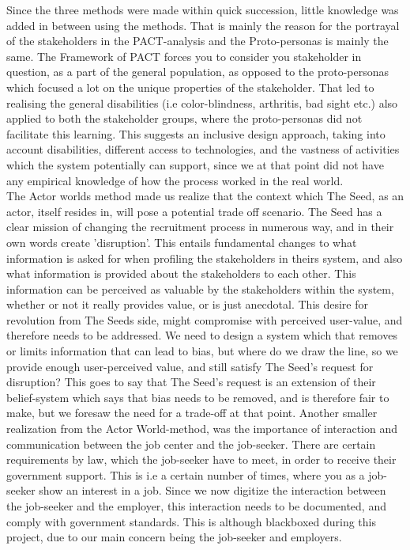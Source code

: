 \newpage

Since the three methods were made within quick succession, little knowledge was added in between using the methods. That is mainly the reason for the portrayal of the stakeholders in the PACT-analysis and the Proto-personas is mainly the same. The Framework of PACT forces you to consider you stakeholder in question, as a part of the general population, as opposed to the proto-personas which focused a lot on the unique properties of the stakeholder. That led to realising the general disabilities (i.e color-blindness, arthritis, bad sight etc.) also applied to both the stakeholder groups, where the proto-personas did not facilitate this learning. This suggests an inclusive design approach, taking into account disabilities, different access to technologies, and the vastness of activities which the system potentially can support, since we at that point did not have any empirical knowledge of how the process worked in the real world.\\

The Actor worlds method made us realize that the context which The Seed, as an actor, itself resides in, will pose a potential trade off scenario. The Seed has a clear mission of changing the recruitment process in numerous way, and in their own words create 'disruption'. This entails fundamental changes to what information is asked for when profiling the stakeholders in theirs system, and also what information is provided about the stakeholders to each other. This information can be perceived as valuable by the stakeholders within the system, whether or not it really provides value, or is just anecdotal. This desire for revolution from The Seeds side, might compromise with perceived user-value, and therefore needs to be addressed. We need to design a system which that removes or limits information that can lead to bias, but where do we draw the line, so we provide enough user-perceived value, and still satisfy The Seed's request for disruption? This goes to say that The Seed's request is an extension of their belief-system which says that bias needs to be removed, and is therefore fair to make, but we foresaw the need for a trade-off at that point. 
Another smaller realization from the Actor World-method, was the importance of interaction and communication between the job center and the job-seeker. There are certain requirements by law, which the job-seeker have to meet, in order to receive their government support. This is i.e a certain number of times, where you as a job-seeker show an interest in a job. Since we now digitize the interaction between the job-seeker and the employer, this interaction needs to be documented, and comply with government standards. This is although blackboxed during this project, due to our main concern being the job-seeker and employers.\\

